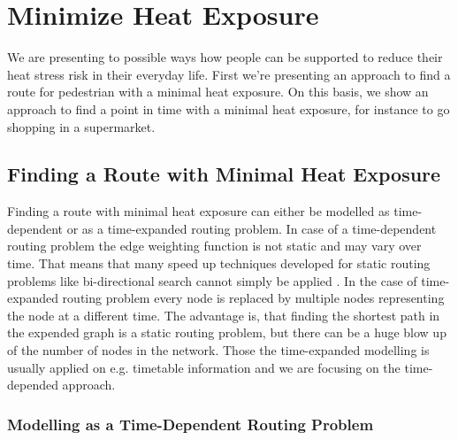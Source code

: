 
\section{Minimize Heat Exposure}

We are presenting to possible ways how people can be supported to reduce their heat stress risk in their everyday life. First we're presenting an approach to find a route for pedestrian with a minimal heat exposure. On this basis, we show an approach to find a point in time with a minimal heat exposure, for instance to go shopping in a supermarket.

\subsection{Finding a Route with Minimal Heat Exposure}

Finding a route with minimal heat exposure can either be modelled as time-dependent or as a time-expanded routing problem. In case of a time-dependent routing problem the edge weighting function is not static and may vary over time. That means that many speed up techniques developed for static routing problems like bi-directional search cannot simply be applied \parencite{Delling2009}. In the case of time-expanded routing problem every node is replaced by multiple nodes representing the node at a different time. The advantage is, that finding the shortest path in the expended graph is a static routing problem, but there can be a huge blow up of the number of nodes in the network. Those the time-expanded modelling is usually applied on e.g. timetable information \parencite{Delling2009} and we are focusing on the time-depended approach. 

\subsubsection{Modelling as a Time-Dependent Routing Problem}

